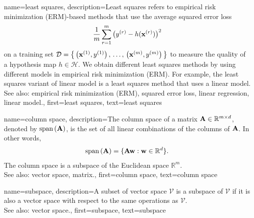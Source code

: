 {
{name={least squares},
 description={Least squares refers to empirical risk minimization (ERM)-based 
               methods that use the average squared error loss 
			   $$ \frac{1}{m} \sum_{r=1}^{m} \big( y^{(r)} 
			   - h({\bf x}^{(r)}) \big)^{2} $$   
			   on a training set $\mathcal{D} = \big\{ \left( {\bf x}^{(1)},y^{(1)} \right), \,\ldots, \,
			   \left( {\bf x}^{(m)},y^{(m)} \right) \big\}$	
			   to measure the quality of a hypothesis map $h \in \mathcal{H}$. 
			   We obtain different least squares methods by using different models 
			   in empirical risk minimization (ERM). For example, the least squares variant of linear model 
			   is a least squares method that uses a linear model.
			   \\
		See also: empirical risk minimization (ERM), squared error loss, linear regression, linear model.},
	first={least squares},
	text={least squares}
}

{name={column space},
 description={The column space of a matrix 
                 ${\bf A} \in \mathbb{R}^{m \times d}$,
			   denoted by ${\rm span}\left({\bf A} \right)$, is the set of all linear combinations of the 
			   columns of ${\bf A}$. In other words, 
			   $$ {\rm span}\left({\bf A} \right) = \{ {\bf A} {\bf w} : {\bf w} \in \mathbb{R}^{d} \}. $$
			   The column space is a subspace of the Euclidean space $\mathbb{R}^{m}$.
			   \\
		See also: vector space, matrix.},
	first={column space},
	text={column space}
}

{name={subspace},
 description={A subset of vector space $\mathcal{V}$ is a subspace of $\mathcal{V}$ if it is also a 
			   vector space with respect to the same operations as $\mathcal{V}$.
			   \\
		See also: vector space.},
	first={subspace},
	text={subspace}
}



}
